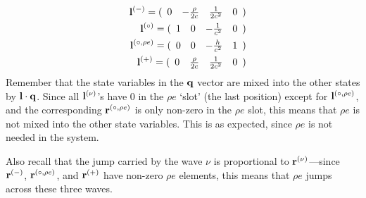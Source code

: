 \begin{eqnarray}
&&
{\bf l}^{(-)} = ( \begin{array}{cccc} 0 & -\frac{\rho}{2c} & \frac{1}{2c^2} & 0
            \end{array} ) \nonumber \\
&&
{\bf l}^{(\circ)} = ( \begin{array}{cccc} 1 & 0 & -\frac{1}{c^2} & 0
            \end{array} ) \nonumber \\
&&
{\bf l}^{(\circ,\rho e)} = ( \begin{array}{cccc} 0 & 0 & -\frac{h}{c^2} & 1
            \end{array} ) \nonumber \\
&&
{\bf l}^{(+)} = ( \begin{array}{cccc} 0 & \frac{\rho}{2c} & \frac{1}{2c^2} & 0
            \end{array} )
\end{eqnarray}
Remember that the state variables in the ${\bf q}$ vector are mixed into the
other states by ${\bf l} \cdot {\bf q}$.  Since all ${\bf l}^{(\nu)}$'s have $0$ in the
$\rho e$ `slot' (the last position) except for ${\bf l}^{(\circ,\rho e)}$, and the
corresponding ${\bf r}^{(\circ,\rho e)}$ is only non-zero in the $\rho e$ slot, this
means that $\rho e$ is not mixed into the other state variables.  This
is as expected, since $\rho e$ is not needed in the system.

Also recall that the jump carried by the wave $\nu$ is proportional
to ${\bf r}^{(\nu)}$---since ${\bf r}^{(-)}$, ${\bf r}^{(\circ,\rho e)}$, and ${\bf r}^{(+)}$ have
non-zero $\rho e$ elements, this means that $\rho e$ jumps across
these three waves.

